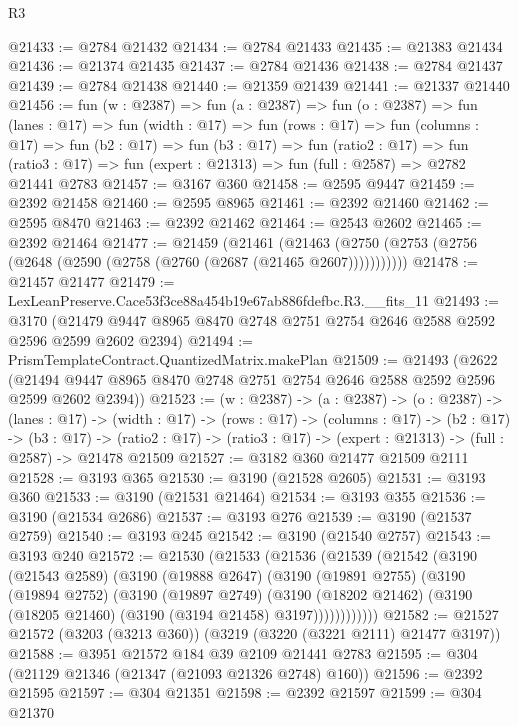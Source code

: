 \begin{lexlean}{R3}
\begin{coremodule}
@21433 := @2784 @21432
@21434 := @2784 @21433
@21435 := @21383 @21434
@21436 := @21374 @21435
@21437 := @2784 @21436
@21438 := @2784 @21437
@21439 := @2784 @21438
@21440 := @21359 @21439
@21441 := @21337 @21440
@21456 := fun (w : @2387) =>
  fun (a : @2387) =>
  fun (o : @2387) =>
  fun (lanes : @17) =>
  fun (width : @17) =>
  fun (rows : @17) =>
  fun (columns : @17) =>
  fun (b2 : @17) =>
  fun (b3 : @17) =>
  fun (ratio2 : @17) =>
  fun (ratio3 : @17) => fun (expert : @21313) => fun (full : @2587) => @2782 @21441 @2783
@21457 := @3167 @360
@21458 := @2595 @9447
@21459 := @2392 @21458
@21460 := @2595 @8965
@21461 := @2392 @21460
@21462 := @2595 @8470
@21463 := @2392 @21462
@21464 := @2543 @2602
@21465 := @2392 @21464
@21477 := @21459
    (@21461 (@21463 (@2750 (@2753 (@2756 (@2648 (@2590 (@2758 (@2760 (@2687 (@21465 @2607)))))))))))
@21478 := @21457 @21477
@21479 := LexLeanPreserve.Cace53f3ce88a454b19e67ab886fdefbc.R3.__fits_11
@21493 := @3170
    (@21479 @9447 @8965 @8470 @2748 @2751 @2754 @2646 @2588 @2592 @2596 @2599 @2602 @2394)
@21494 := PrismTemplateContract.QuantizedMatrix.makePlan
@21509 := @21493
    (@2622 (@21494 @9447 @8965 @8470 @2748 @2751 @2754 @2646 @2588 @2592 @2596 @2599 @2602 @2394))
@21523 := (w : @2387) ->
  (a : @2387) ->
  (o : @2387) ->
  (lanes : @17) ->
  (width : @17) ->
  (rows : @17) ->
  (columns : @17) ->
  (b2 : @17) ->
  (b3 : @17) ->
  (ratio2 : @17) -> (ratio3 : @17) -> (expert : @21313) -> (full : @2587) -> @21478 @21509
@21527 := @3182 @360 @21477 @21509 @2111
@21528 := @3193 @365
@21530 := @3190 (@21528 @2605)
@21531 := @3193 @360
@21533 := @3190 (@21531 @21464)
@21534 := @3193 @355
@21536 := @3190 (@21534 @2686)
@21537 := @3193 @276
@21539 := @3190 (@21537 @2759)
@21540 := @3193 @245
@21542 := @3190 (@21540 @2757)
@21543 := @3193 @240
@21572 := @21530
    (@21533
      (@21536
        (@21539
          (@21542
            (@3190
              (@21543 @2589)
              (@3190
                (@19888 @2647)
                (@3190
                  (@19891 @2755)
                  (@3190
                    (@19894 @2752)
                    (@3190
                      (@19897 @2749)
                      (@3190
                        (@18202 @21462)
                        (@3190 (@18205 @21460) (@3190 (@3194 @21458) @3197))))))))))))
@21582 := @21527 @21572 (@3203 (@3213 @360)) (@3219 (@3220 (@3221 @2111) @21477 @3197))
@21588 := @3951 @21572 @184 @39 @2109 @21441 @2783
@21595 := @304 (@21129 @21346 (@21347 (@21093 @21326 @2748) @160))
@21596 := @2392 @21595
@21597 := @304 @21351
@21598 := @2392 @21597
@21599 := @304 @21370

\end{coremodule}
\end{lexlean}
